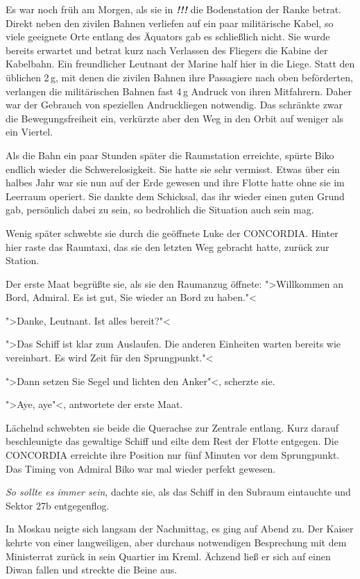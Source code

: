 Es war noch früh am Morgen, als sie in \emph{\textbf{!!!}} die Bodenstation der Ranke betrat. Direkt neben den zivilen Bahnen verliefen auf ein paar militärische Kabel, so viele geeignete Orte entlang des Äquators gab es schließlich nicht. Sie wurde bereits erwartet und betrat kurz nach Verlassen des Fliegers die Kabine der Kabelbahn. Ein freundlicher Leutnant der Marine half hier in die Liege. Statt den üblichen 2\,g, mit denen die zivilen Bahnen ihre Passagiere nach oben beförderten, verlangen die militärischen Bahnen fast 4\,g Andruck von ihren Mitfahrern. Daher war der Gebrauch von speziellen Andruckliegen notwendig. Das schränkte zwar die Bewegungsfreiheit ein, verkürzte aber den Weg in den Orbit auf weniger als ein Viertel.

Als die Bahn ein paar Stunden später die Raumstation erreichte, spürte Biko endlich wieder die Schwerelosigkeit. Sie hatte sie sehr vermisst. Etwas über ein halbes Jahr war sie nun auf der Erde gewesen und ihre Flotte hatte ohne sie im Leerraum operiert. Sie dankte dem Schicksal, das ihr wieder einen guten Grund gab, persönlich dabei zu sein, so bedrohlich die Situation auch sein mag.

Wenig später schwebte sie durch die geöffnete Luke der \textsf{CONCORDIA}. Hinter hier raste das Raumtaxi, das sie den letzten Weg gebracht hatte, zurück zur Station.

Der erste Maat begrüßte sie, als sie den Raumanzug öffnete: ">Willkommen an Bord, Admiral. Es ist gut, Sie wieder an Bord zu haben."<

">Danke, Leutnant. Ist alles bereit?"<

">Das Schiff ist klar zum Auslaufen. Die anderen Einheiten warten bereits wie vereinbart. Es wird Zeit für den Sprungpunkt."<

">Dann setzen Sie Segel und lichten den Anker"<, scherzte sie.

">Aye, aye"<, antwortete der erste Maat.

Lächelnd schwebten sie beide die Querachse zur Zentrale entlang. Kurz darauf beschleunigte das gewaltige Schiff und eilte dem Rest der Flotte entgegen. Die \textsf{CONCORDIA} erreichte ihre Position nur fünf Minuten vor dem Sprungpunkt. Das Timing von Admiral Biko war mal wieder perfekt gewesen.

\emph{So sollte es immer sein}, dachte sie, als das Schiff in den Subraum eintauchte und Sektor \textsf{27b} entgegenflog. 

\mbox{}

In Moskau neigte sich langsam der Nachmittag, es ging auf Abend zu. Der Kaiser kehrte von einer langweiligen, aber durchaus notwendigen Besprechung mit dem Ministerrat zurück in sein Quartier im Kreml. Ächzend ließ er sich auf einen Diwan fallen und streckte die Beine aus.

